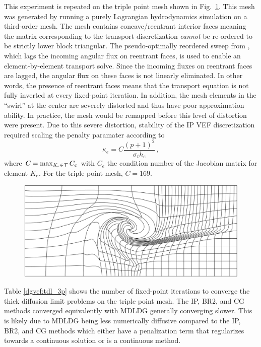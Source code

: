 \documentclass[../doc.tex]{subfiles}
\begin{document}
This experiment is repeated on the triple point mesh shown in Fig.~\ref{dgvef:3point_mesh}. This mesh was generated by running a purely Lagrangian hydrodynamics simulation on a third-order mesh. The mesh contains concave/reentrant interior faces meaning the matrix corresponding to the transport discretization \emph{cannot} be re-ordered to be strictly lower block triangular. The pseudo-optimally reordered sweep from \cite{graph_sweeps}, which lags the incoming angular flux on reentrant faces, is used to enable an element-by-element transport solve. Since the incoming fluxes on reentrant faces are lagged, the angular flux on these faces is not linearly eliminated. In other words, the presence of reentrant faces means that the transport equation is not fully inverted at every fixed-point iteration. In addition, the mesh elements in the ``swirl'' at the center are severely distorted and thus have poor approximation ability. In practice, the mesh would be remapped before this level of distortion were present. Due to this severe distortion, stability of the IP VEF discretization required scaling the penalty paramater according to 
	\begin{equation}
		\kappa_e = C \frac{(p+1)^2}{\sigma_t h_e} \,,
	\end{equation}	
where $C = \max_{K_e \in \mathcal{T}} C_e$ with $C_e$ the condition number of the Jacobian matrix for element $K_e$. For the triple point mesh, $C=169$.
\begin{figure}
\centering
\includegraphics[width=.65\textwidth]{data/img/3point.png}
\caption{}
\label{dgvef:3point_mesh}
\end{figure}

Table \ref{dgvef:tdl_3p} shows the number of fixed-point iterations to converge the thick diffusion limit problems on the triple point mesh. The IP, BR2, and CG methods converged equivalently with MDLDG generally converging slower. This is likely due to MDLDG being less numerically diffusive compared to the IP, BR2, and CG methods which either have a penalization term that regularizes towards a continuous solution or is a continuous method. 
\begin{table}
\centering
\caption{}
\label{dgvef:tdl_3p}

\end{table}
\end{document}

